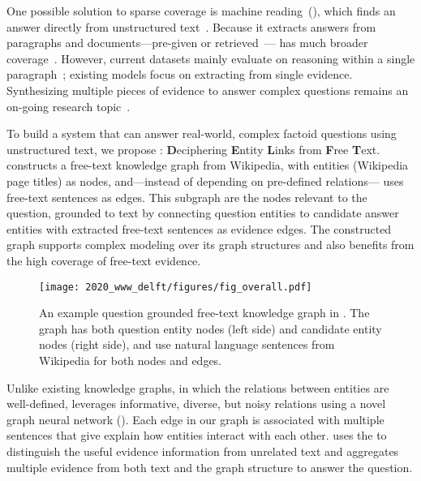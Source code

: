 One possible solution to sparse coverage is machine
reading~(), which finds an answer directly from unstructured
text~\cite{chen2018neural}.
%
Because it extracts answers from paragraphs and documents---pre-given
or retrieved~\cite{rajpurkar2016squad, clark2018simple,
  zhong2019coarse}--- has much broader coverage~\cite{marco}.
%
However, current  datasets mainly evaluate on reasoning
within a single paragraph~\cite{min2018efficient}; existing
 models focus on extracting from single evidence.
%
Synthesizing multiple pieces of evidence to answer
complex questions remains an on-going research 
topic~\cite{yang2018hotpotqa, min2019compositional}.


To build a  system that can answer real-world, complex factoid
questions 
using unstructured text, 
we propose \name{}: \textbf{D}eciphering \textbf{E}ntity
\textbf{L}inks from \textbf{F}ree \textbf{T}ext.
%
\name{} constructs a free-text knowledge graph from Wikipedia, with
entities (Wikipedia page titles) as nodes, and---instead of depending
on pre-defined relations---\name{} uses free-text sentences as edges.
%
This subgraph are the nodes relevant to the question, grounded to text
by connecting question entities to candidate answer entities with
extracted free-text sentences as evidence edges.
%
The constructed graph supports complex modeling over
its graph structures and also benefits from the high coverage of
free-text evidence.


\begin{figure*}[t]
    \begin{center}
    \texttt{[image: 2020\_www\_delft/figures/fig\_overall.pdf]}
    \end{center}
    \caption{An example question grounded free-text knowledge graph in
      \name{}. The graph has both question entity nodes (left side)
      and candidate entity nodes (right side), and use natural
      language sentences from Wikipedia for both nodes and edges.}
    \label{fig:graph}
\end{figure*}


Unlike existing knowledge graphs, in which the relations between
entities are well-defined, \name{} leverages informative, diverse, but noisy
relations using a novel graph neural network ().
%
Each edge in our graph is associated with multiple sentences that give
explain how entities interact with each other. \name{} uses the  to distinguish the 
useful evidence information from unrelated text and aggregates
multiple evidence from both text and the graph structure to answer the question.
%
%

